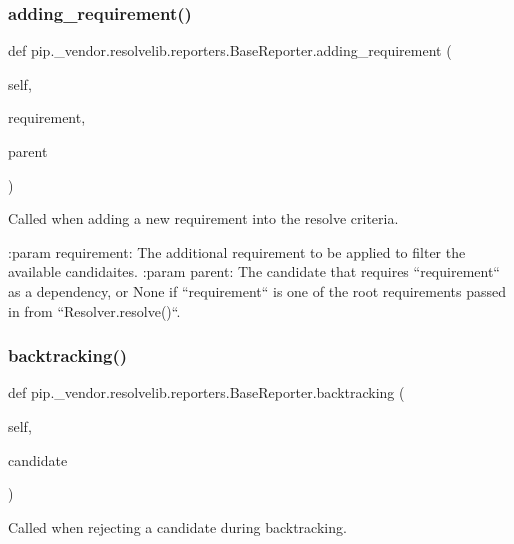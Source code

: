 \subsubsection{\texorpdfstring{adding\+\_\+requirement()}{adding\_requirement()}}
{\footnotesize\ttfamily def pip.\+\_\+vendor.\+resolvelib.\+reporters.\+Base\+Reporter.\+adding\+\_\+requirement (\begin{DoxyParamCaption}\item[{}]{self,  }\item[{}]{requirement,  }\item[{}]{parent }\end{DoxyParamCaption})}

\begin{DoxyVerb}Called when adding a new requirement into the resolve criteria.

:param requirement: The additional requirement to be applied to filter
    the available candidaites.
:param parent: The candidate that requires ``requirement`` as a
    dependency, or None if ``requirement`` is one of the root
    requirements passed in from ``Resolver.resolve()``.
\end{DoxyVerb}
 \mbox{\label{classpip_1_1__vendor_1_1resolvelib_1_1reporters_1_1BaseReporter_a3e424690ece597e4b5b16126f61715d7}} 
\subsubsection{\texorpdfstring{backtracking()}{backtracking()}}
{\footnotesize\ttfamily def pip.\+\_\+vendor.\+resolvelib.\+reporters.\+Base\+Reporter.\+backtracking (\begin{DoxyParamCaption}\item[{}]{self,  }\item[{}]{candidate }\end{DoxyParamCaption})}

\begin{DoxyVerb}Called when rejecting a candidate during backtracking.\end{DoxyVerb}
 \mbox{\label{classpip_1_1__vendor_1_1resolvelib_1_1reporters_1_1BaseReporter_aebc4b7ba39644a91d34430020cf50801}} 
